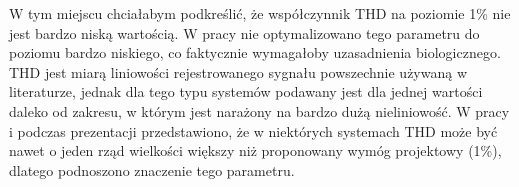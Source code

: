 \begin{frame}[t]
    \vspace{-1em}
    \begin{block}{\dk}
    \end{block}

    {\renewcommand\normalsize{\scriptsize}%
    \normalsize
        W tym miejscu chciałabym podkreślić, że współczynnik THD na poziomie 1\% nie jest bardzo niską wartością. 
        W pracy nie optymalizowano tego parametru do poziomu bardzo niskiego, co faktycznie wymagałoby uzasadnienia biologicznego. 
        THD jest miarą liniowości rejestrowanego sygnału powszechnie używaną w literaturze, jednak dla tego typu systemów podawany jest dla jednej wartości daleko od zakresu, w którym jest narażony na bardzo dużą nieliniowość. 
        W pracy i podczas prezentacji przedstawiono, że w niektórych systemach THD może być nawet o jeden rząd wielkości większy niż proponowany wymóg projektowy (1\%), dlatego podnoszono znaczenie tego parametru.
    }


\end{frame}

